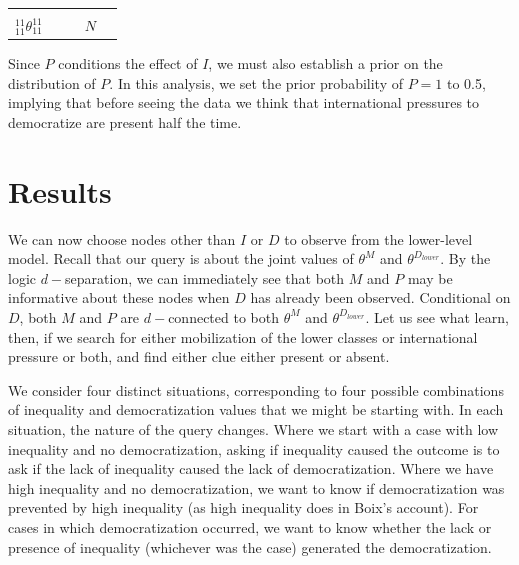 \documentclass[12pt,]{book}
\begin{document}
\begin{longtable}[]{@{}ccccc@{}}
\begin{minipage}[t]{0.18\columnwidth}
\strut
\end{minipage} & \begin{minipage}[t]{0.15\columnwidth}\centering
\strut
\end{minipage}\tabularnewline
\begin{minipage}[t]{0.24\columnwidth}\centering
\(_{11}^{11}\theta_{11}^{11}\)\strut
\end{minipage} & \begin{minipage}[t]{0.09\columnwidth}\centering
\strut
\end{minipage} & \begin{minipage}[t]{0.20\columnwidth}\centering
\strut
\end{minipage} & \begin{minipage}[t]{0.18\columnwidth}\centering
\(N\)\strut
\end{minipage} & \begin{minipage}[t]{0.15\columnwidth}\centering
0.05\strut
\end{minipage}\tabularnewline
\bottomrule
\end{longtable}

Since \(P\) conditions the effect of \(I\), we must also establish a prior on the distribution of \(P\). In this analysis, we set the prior probability of \(P=1\) to 0.5, implying that before seeing the data we think that international pressures to democratize are present half the time.

\hypertarget{results}{%
\section{Results}\label{results}}

We can now choose nodes other than \(I\) or \(D\) to observe from the lower-level model. Recall that our query is about the joint values of \(\theta^M\) and \(\theta^{D_{lower}}\). By the logic \(d-\)separation, we can immediately see that both \(M\) and \(P\) may be informative about these nodes when \(D\) has already been observed. Conditional on \(D\), both \(M\) and \(P\) are \(d-\)connected to both \(\theta^M\) and \(\theta^{D_{lower}}\). Let us see what learn, then, if we search for either mobilization of the lower classes or international pressure or both, and find either clue either present or absent.

We consider four distinct situations, corresponding to four possible combinations of inequality and democratization values that we might be starting with. In each situation, the nature of the query changes. Where we start with a case with low inequality and no democratization, asking if inequality caused the outcome is to ask if the lack of inequality caused the lack of democratization. Where we have high inequality and no democratization, we want to know if democratization was prevented by high inequality (as high inequality does in Boix's account). For cases in which democratization occurred, we want to know whether the lack or presence of inequality (whichever was the case) generated the democratization.
\end{document}
